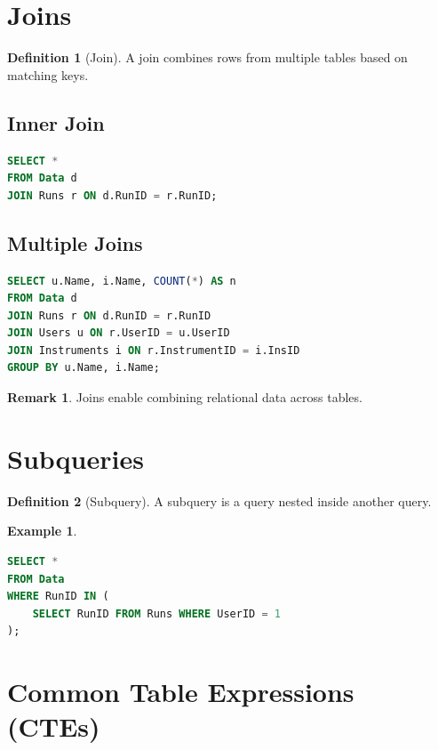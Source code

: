 \documentclass[12pt,oneside]{book}
\numberwithin{equation}{section}
\theoremstyle{definition}
\newtheorem{definition}{Definition}[section]
\newtheorem{example}{Example}[section]
\newtheorem{remark}{Remark}[section]
\theoremstyle{plain}
\theoremstyle{remark}
\begin{document}
\section{Joins}

\begin{definition}[Join]
A join combines rows from multiple tables based on matching keys.
\end{definition}

\subsection{Inner Join}

\begin{lstlisting}[language=SQL]
SELECT *
FROM Data d
JOIN Runs r ON d.RunID = r.RunID;
\end{lstlisting}

\subsection{Multiple Joins}

\begin{lstlisting}[language=SQL]
SELECT u.Name, i.Name, COUNT(*) AS n
FROM Data d
JOIN Runs r ON d.RunID = r.RunID
JOIN Users u ON r.UserID = u.UserID
JOIN Instruments i ON r.InstrumentID = i.InsID
GROUP BY u.Name, i.Name;
\end{lstlisting}

\begin{remark}
Joins enable combining relational data across tables.
\end{remark}

\section{Subqueries}

\begin{definition}[Subquery]
A subquery is a query nested inside another query.
\end{definition}

\begin{example}
\begin{lstlisting}[language=SQL]
SELECT *
FROM Data
WHERE RunID IN (
    SELECT RunID FROM Runs WHERE UserID = 1
);
\end{lstlisting}
\end{example}

\section{Common Table Expressions (CTEs)}
\end{document}
